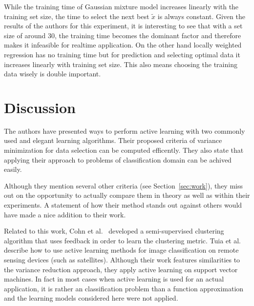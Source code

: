 \documentclass{article}
\newcommand{\xt}{\tilde{x}}
\begin{document}
While the training time of Gaussian mixture model increases linearly with
the training set size, the time to select the next best $\xt$ is always constant.
Given the results of the authors for this experiment, it is interesting to see that with a set size of
around 30, the training time becomes the dominant factor and therefore makes
it infeasible for realtime application.
On the other hand locally weighted regression has no training time but for prediction
and selecting optimal data it increases linearly with training set size.
This also means choosing the training data wisely is double important.

\section{Discussion}
The authors have presented ways to perform active learning with two commonly used
and elegant learning algorithms. Their proposed criteria of variance minimization
for data selection can be computed efficently.
They also state that applying their approach to problems of classification
domain can be achived easily.

Although they mention several other criteria (see Section~\ref{sec:work}), they
miss out on the opportunity to actually compare them in theory as well as
within their experiments. A statement of how their method stands out against
others would have made a nice addition to their work.

Related to this work, Cohn et al.~ developed a
semi-supervised clustering algorithm that uses feedback in order to learn
the clustering metric.
Tuia et al. describe how to use active learning methods
for image classification on remote sensing devices (such as satellites).
Although their work features similarities to the variance reduction approach,
they apply active learning on support vector machines.
In fact in most cases when active learning is used for an actual application,
it is rather an classification problem than a function approximation and
the learning models considered here were not applied.





\end{document}

